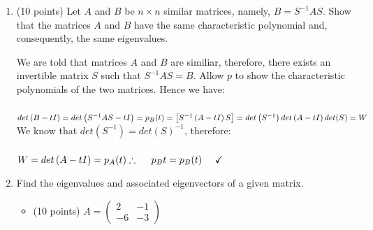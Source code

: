 \documentclass[fleqn]{article}
\begin{document}
  \begin{enumerate}
    \item (10 points) Let $A$ and $B$ be $n \times n$ similar matrices, namely, $B=S^{-1} AS$. Show that the matrices $A$ and $B$ have 
    the same characteristic polynomial and,  consequently, the same eigenvalues.

      \textcolor{hwColor}{
        We are told that matrices $A$ and $B$ are similiar, therefore, there exists an invertible matrix $S$
        such that $S^{-1} AS=B$. Allow $p$ to show the characteristic polynomials of the two matrices. Hence we have:
        \\
        \\
        $
          det\left(B-t I\right)=det \left(S^{-1} AS-t I\right)=p_B(t)
          \\
          \\
          =\left[S^{-1} \left(A-t I\right)S\right]=det\left(S^{-1}\right) det\left(A-t I\right) det(S)=W
          \\
          \\
        $
        We know that $det(S^{-1})=det(S)^{-1}$, therefore:
        \\
        \\
        $
          W=det\left(A-t I\right)=p_A(t)
          \\
          \\
          \\
          \therefore ~~~~ p_B{t}=p_B(t)  ~~~~ \checkmark
        $
      }

    \item Find the eigenvalues and associated eigenvectors of a given matrix.
    \begin{itemize}
      \item (10 points) $A=\begin{pmatrix}
        2 & -1 
        \\
        -6 & -3
      \end{pmatrix}$


\end{itemize}
\end{enumerate}
\end{document}
